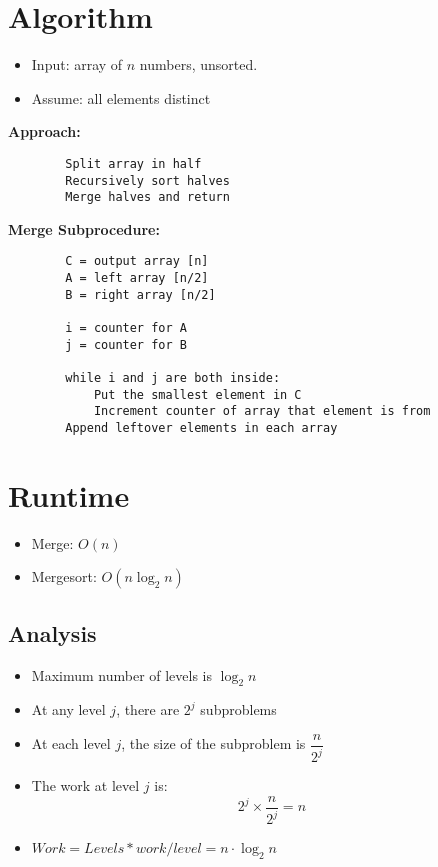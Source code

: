 \documentclass[11pt]{article}
\begin{document}
\section{Algorithm}
	\begin{itemize}
		\itemsep=-2pt
		\item Input: array of $n$ numbers, unsorted.
		\item Assume: all elements distinct
	\end{itemize}
	
	
	\textbf{Approach:}
	\begin{lstlisting}
		Split array in half
		Recursively sort halves
		Merge halves and return
	\end{lstlisting}
	
	
	\textbf{Merge Subprocedure:}
	\begin{lstlisting}
		C = output array [n]
		A = left array [n/2]
		B = right array [n/2]
		
		i = counter for A
		j = counter for B
		
		while i and j are both inside:
			Put the smallest element in C
			Increment counter of array that element is from
		Append leftover elements in each array
	\end{lstlisting}
		
\section{Runtime}
	\begin{itemize}
		\itemsep=-2pt
		\item Merge: $O(n)$
		\item Mergesort: $O(n\log_2 n)$
	\end{itemize}
	
	\subsection{Analysis}
		\begin{itemize}
			\item Maximum number of levels is $\log_2 n$
			\item At any level $j$, there are $2^j$ subproblems
			\item At each level $j$, the size of the subproblem is $\dfrac{n}{2^j}$
			\item The work at level $j$ is:
				\begin{equation}
				2^j \times \frac{n}{2^j} = n
				\end{equation}
			\item $Work = Levels * work/level = n \cdot \log_2 n$
		\end{itemize}
		
\end{document}
